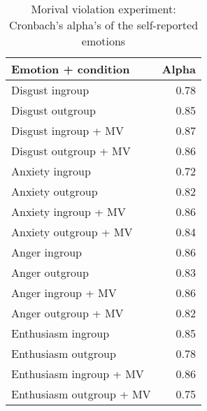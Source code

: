 \begin{table}[ht]
\centering
\caption{Morival violation experiment: Cronbach's alpha's of the self-reported emotions} 
\label{tab:selfreport_cronbach}
\begingroup\fontsize{10pt}{10pt}\selectfont
\begin{tabular}{lr}
  \hline
Emotion + condition & Alpha \\ 
  \hline
Disgust ingroup & 0.78 \\ 
  Disgust outgroup & 0.85 \\ 
  Disgust ingroup + MV & 0.87 \\ 
  Disgust outgroup + MV & 0.86 \\ 
  Anxiety ingroup & 0.72 \\ 
  Anxiety outgroup & 0.82 \\ 
  Anxiety ingroup + MV & 0.86 \\ 
  Anxiety outgroup + MV & 0.84 \\ 
  Anger ingroup & 0.86 \\ 
  Anger outgroup & 0.83 \\ 
  Anger ingroup + MV & 0.86 \\ 
  Anger outgroup + MV & 0.82 \\ 
  Enthusiasm ingroup & 0.85 \\ 
  Enthusiasm outgroup & 0.78 \\ 
  Enthusiasm ingroup + MV & 0.86 \\ 
  Enthusiasm outgroup + MV & 0.75 \\ 
   \hline
\end{tabular}
\endgroup
\end{table}
